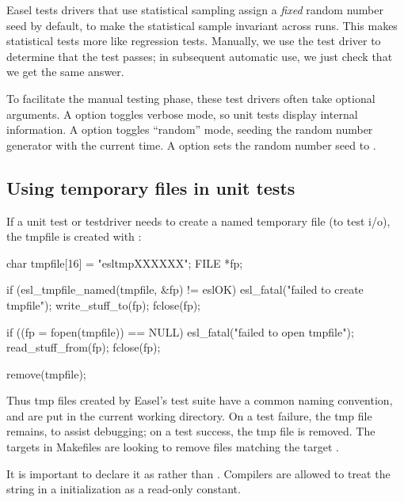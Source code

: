 Easel tests drivers that use statistical sampling assign a
\emph{fixed} random number seed by default, to make the statistical
sample invariant across runs. This makes statistical tests more like
regression tests. Manually, we use the test driver to determine that
the test passes; in subsequent automatic use, we just check that we
get the same answer.

To facilitate the manual testing phase, these test drivers often take
optional arguments. A  option toggles verbose mode, so unit
tests display internal information. A  option toggles
``random'' mode, seeding the random number generator with the current
time. A  option sets the random number seed to
.

\subsection{Using temporary files in unit tests}

If a unit test or testdriver needs to create a named temporary file
(to test i/o), the tmpfile is created with
:

\begin{cchunk}
   char  tmpfile[16] = "esltmpXXXXXX";
   FILE *fp;

   if (esl_tmpfile_named(tmpfile, &fp) != eslOK) esl_fatal("failed to create tmpfile");
   write_stuff_to(fp);
   fclose(fp);

   if ((fp = fopen(tmpfile)) == NULL) esl_fatal("failed to open tmpfile");
   read_stuff_from(fp);
   fclose(fp);

   remove(tmpfile);
\end{cchunk}

Thus tmp files created by Easel's test suite have a common naming
convention, and are put in the current working directory. On a test
failure, the tmp file remains, to assist debugging; on a test success,
the tmp file is removed. The  targets in Makefiles
are looking to remove files matching the target .

It is important to declare it as  rather than
. Compilers are allowed to treat the string in a
 initialization as a read-only constant.





